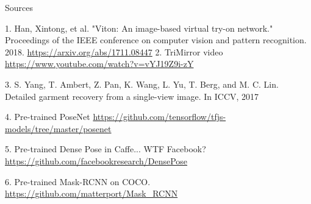 \documentclass{beamer}
\begin{document}
\begin{frame}{Sources}
\begin{thebibliography}{0}

   1. Han, Xintong, et al. "Viton: An image-based virtual try-on network." Proceedings of the IEEE conference on computer vision and pattern recognition. 2018. \url{https://arxiv.org/abs/1711.08447} 
   2. TriMirror video \url{https://www.youtube.com/watch?v=vYJ19Z9i-zY} 
  
   3. S. Yang, T. Ambert, Z. Pan, K. Wang, L. Yu, T. Berg, and M. C. Lin. Detailed garment recovery from a single-view image. In ICCV, 2017
  
  
   4. Pre-trained PoseNet  \url{https://github.com/tensorflow/tfjs-models/tree/master/posenet} 
  

   5. Pre-trained Dense Pose in Caffe... WTF Facebook? \url{https://github.com/facebookresearch/DensePose} 
  
   6. Pre-trained Mask-RCNN on COCO. \url{https://github.com/matterport/Mask_RCNN} 
  
  
\end{thebibliography}
\end{frame} 
\end{document}
